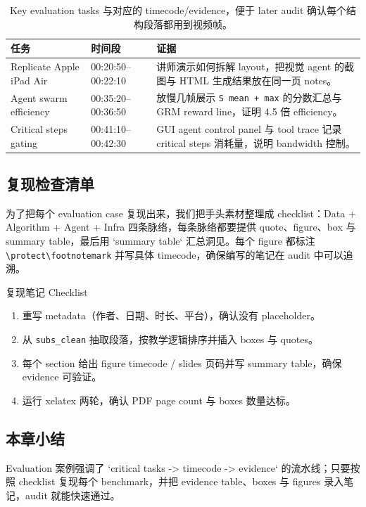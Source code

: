 \documentclass[a4paper]{article}
\begin{document}
\begin{table}[H]
\footnotesize
\centering
\begin{tabular}{p{3cm}p{4cm}p{5cm}}
\toprule
任务 & 时间段 & 证据 \\
\midrule
Replicate Apple iPad Air & 00:20:50--00:22:10 & 讲师演示如何拆解 layout，把视觉 agent 的截图与 HTML 生成结果放在同一页 notes。 \\
Agent swarm efficiency & 00:35:20--00:36:50 & 放慢几帧展示 \texttt{S mean + max} 的分数汇总与 GRM reward line，证明 4.5 倍 efficiency。 \\
Critical steps gating & 00:41:10--00:42:30 & GUI agent control panel 与 tool trace 记录 critical steps 消耗量，说明 bandwidth 控制。 \\
\bottomrule
\end{tabular}
\caption{Key evaluation tasks 与对应的 timecode/evidence，便于 later audit 确认每个结构段落都用到视频帧。}
\end{table}

\subsection{复现检查清单}
为了把每个 evaluation case 复现出来，我们把手头素材整理成 checklist：Data + Algorithm + Agent + Infra 四条脉络，每条脉络都要提供 quote、figure、box 与 summary table，最后用 `summary table` 汇总洞见。每个 figure 都标注 \verb|\protect\footnotemark| 并写具体 timecode，确保编写的笔记在 audit 中可以追溯。

\begin{importantbox}{复现笔记 Checklist}
\begin{enumerate}
    \item 重写 metadata（作者、日期、时长、平台），确认没有 placeholder。
    \item 从 \texttt{subs\_clean} 抽取段落，按教学逻辑排序并插入 boxes 与 quotes。
    \item 每个 section 给出 figure timecode / slides 页码并写 summary table，确保 evidence 可验证。
    \item 运行 xelatex 两轮，确认 PDF page count 与 boxes 数量达标。
\end{enumerate}
\end{importantbox}

\subsection{本章小结}
Evaluation 案例强调了 `critical tasks -> timecode -> evidence` 的流水线；只要按照 checklist 复现每个 benchmark，并把 evidence table、boxes 与 figures 录入笔记，audit 就能快速通过。
\end{document}
